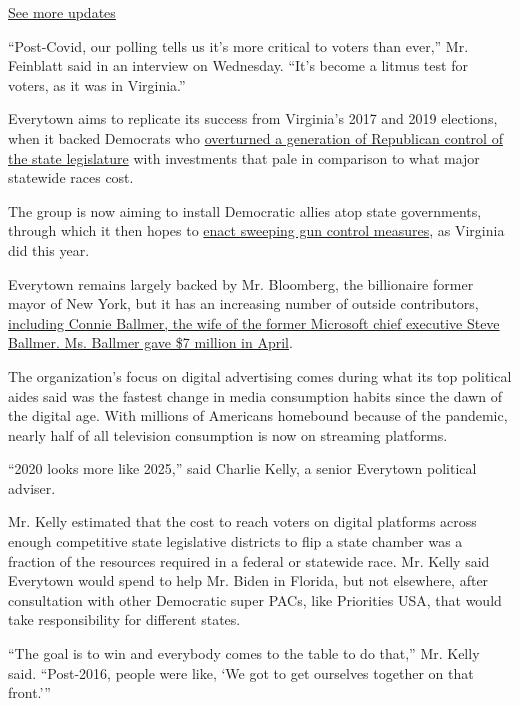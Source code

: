 \href{https://www.nytimes3xbfgragh.onion/2020/08/04/us/elections/primary-election-michigan-arizona-kansas.html?action=click\&pgtype=Article\&state=default\&region=MAIN_CONTENT_1\&context=storylines_live_updates}{See
more updates}

``Post-Covid, our polling tells us it's more critical to voters than
ever,'' Mr. Feinblatt said in an interview on Wednesday. ``It's become a
litmus test for voters, as it was in Virginia.''

Everytown aims to replicate its success from Virginia's 2017 and 2019
elections, when it backed Democrats who
\href{https://www.nytimes3xbfgragh.onion/2019/11/05/us/politics/virginia-elections.html}{overturned
a generation of Republican control of the state legislature} with
investments that pale in comparison to what major statewide races cost.

The group is now aiming to install Democratic allies atop state
governments, through which it then hopes to
\href{https://www.nytimes3xbfgragh.onion/2020/04/13/us/virginia-democrats-new-laws.html}{enact
sweeping gun control measures}, as Virginia did this year.

Everytown remains largely backed by Mr. Bloomberg, the billionaire
former mayor of New York, but it has an increasing number of outside
contributors,
\href{https://twitter.com/teddyschleifer/status/1283561968436015106}{including
Connie Ballmer, the wife of the former Microsoft chief executive Steve
Ballmer. Ms. Ballmer gave \$7 million in April}.

The organization's focus on digital advertising comes during what its
top political aides said was the fastest change in media consumption
habits since the dawn of the digital age. With millions of Americans
homebound because of the pandemic, nearly half of all television
consumption is now on streaming platforms.

``2020 looks more like 2025,'' said Charlie Kelly, a senior Everytown
political adviser.

Mr. Kelly estimated that the cost to reach voters on digital platforms
across enough competitive state legislative districts to flip a state
chamber was a fraction of the resources required in a federal or
statewide race. Mr. Kelly said Everytown would spend to help Mr. Biden
in Florida, but not elsewhere, after consultation with other Democratic
super PACs, like Priorities USA, that would take responsibility for
different states.

``The goal is to win and everybody comes to the table to do that,'' Mr.
Kelly said. ``Post-2016, people were like, `We got to get ourselves
together on that front.'''

